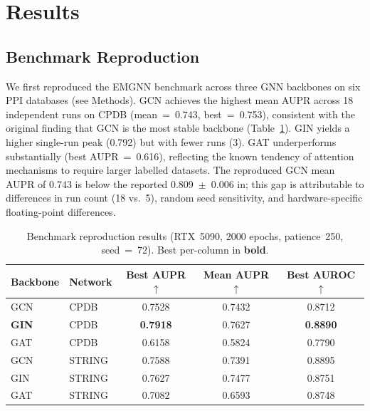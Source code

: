 
\section{Results}

\subsection{Benchmark Reproduction}

We first reproduced the EMGNN benchmark across three GNN backbones on six PPI
databases (see Methods). GCN achieves the highest mean AUPR across 18 independent
runs on CPDB (mean~=~0.743, best~=~0.753), consistent with the original finding
that GCN is the most stable backbone (Table~\ref{tab:benchmark}). GIN yields a
higher single-run peak (0.792) but with fewer runs (3). GAT underperforms
substantially (best AUPR~=~0.616), reflecting the known tendency of attention
mechanisms to require larger labelled datasets. The reproduced GCN mean AUPR of
0.743 is below the reported 0.809~$\pm$~0.006 in\cite{emgnn2023}; this gap is
attributable to differences in run count (18 vs.\ 5), random seed sensitivity,
and hardware-specific floating-point differences.

\begin{table}[ht]
  \centering
  \caption{Benchmark reproduction results (RTX~5090, 2000 epochs, patience~250,
           seed~=~72). Best per-column in \textbf{bold}.}
  \label{tab:benchmark}
  \small
  \begin{tabular}{llccc}
    \toprule
    \textbf{Backbone} & \textbf{Network} & \textbf{Best AUPR $\uparrow$} & \textbf{Mean AUPR $\uparrow$} & \textbf{Best AUROC $\uparrow$} \\
    \midrule
    GCN          & CPDB   & 0.7528          & 0.7432          & 0.8712          \\
    \textbf{GIN} & CPDB   & \textbf{0.7918} & 0.7627          & \textbf{0.8890} \\
    GAT          & CPDB   & 0.6158          & 0.5824          & 0.7790          \\
    \midrule
    GCN          & STRING & 0.7588          & 0.7391          & 0.8895          \\
    GIN          & STRING & 0.7627          & 0.7477          & 0.8751          \\
    GAT          & STRING & 0.7082          & 0.6593          & 0.8748          \\
    \bottomrule
  \end{tabular}
\end{table}

